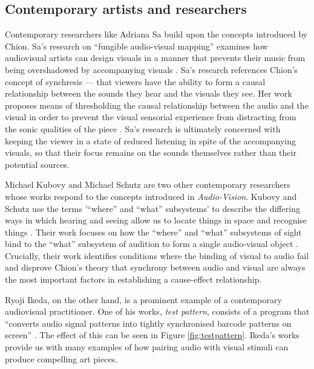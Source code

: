 \documentclass[../initial_thesis.tex]{subfiles}
\begin{document}
\subsection{Contemporary artists and researchers} %
Contemporary researchers like Adriana Sa build upon the concepts introduced by Chion. Sa's research on ``fungible audio-visual mapping'' examines how audiovisual artists can design visuals in a manner that prevents their music from being overshadowed by accompanying visuals \cite{Sa2014}. Sa's research references Chion's concept of synchresis --- that viewers have the ability to form a causal relationship between the sounds they hear and the visuals they see. Her work proposes means of thresholding the causal relationship between the audio and the visual in order to prevent the visual sensorial experience from distracting from the sonic qualities of the piece \cite{Sa2013}. Sa's research is ultimately concerned with keeping the viewer in a state of reduced listening in spite of the accompanying visuals, so that their focus remains on the sounds themselves rather than their potential sources. \par

Michael Kubovy and Michael Schutz are two other contemporary researchers whose works respond to the concepts introduced in \textit{Audio-Vision}. Kubovy and Schutz use the terms '``where'' and ``what'' subsystems' to describe the differing ways in which hearing and seeing allow us to locate things in space and recognise things \cite{Kubovy2010}. Their work focuses on how the ``where'' and ``what'' subsystems of sight bind to the ``what'' subsystem of audition to form a single audio-visual object \cite{Kubovy2010}. Crucially, their work identifies conditions where the binding of visual to audio fail and disprove Chion's theory that synchrony between audio and visual are always the most important factors in establishing a cause-effect relationship. \par

Ryoji Ikeda, on the other hand, is a prominent example of a contemporary audiovisual practitioner. One of his works, \textit{test pattern}, consists of a program that ``converts audio signal patterns into tightly synchronised barcode patterns on screen'' \cite{Ikeda}. The effect of this can be seen in Figure \ref{fig:testpattern}. Ikeda's works provide us with many examples of how pairing audio with visual stimuli can produce compelling art pieces. \par
\end{document}
